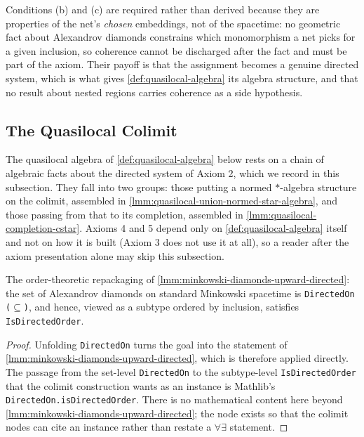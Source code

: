 \begin{definition}
    Conditions (b) and (c) are required rather than derived because they are properties of the net's \emph{chosen} embeddings, not of the spacetime: no geometric fact about Alexandrov diamonds constrains which monomorphism a net picks for a given inclusion, so coherence cannot be discharged after the fact and must be part of the axiom. Their payoff is that the assignment becomes a genuine directed system, which is what gives \ref{def:quasilocal-algebra} its algebra structure, and that no result about nested regions carries coherence as a side hypothesis.
\end{definition}

\subsection{The Quasilocal Colimit}

The quasilocal algebra of \ref{def:quasilocal-algebra} below rests on a chain of algebraic facts about the directed system of Axiom 2, which we record in this subsection. They fall into two groups: those putting a normed $*$-algebra structure on the colimit, assembled in \ref{lmm:quasilocal-union-normed-star-algebra}, and those passing from that to its completion, assembled in \ref{lmm:quasilocal-completion-cstar}. Axioms 4 and 5 depend only on \ref{def:quasilocal-algebra} itself and not on how it is built (Axiom 3 does not use it at all), so a reader after the axiom presentation alone may skip this subsection.

\begin{lemma}
    \label{lmm:alexandrov-diamonds-isDirected}
    \leanok
    The order-theoretic repackaging of \ref{lmm:minkowski-diamonds-upward-directed}: the set of Alexandrov diamonds on standard Minkowski spacetime is \texttt{DirectedOn (\ensuremath{\subseteq})}, and hence, viewed as a subtype ordered by inclusion, satisfies \texttt{IsDirectedOrder}.
\end{lemma}
\begin{proof}
    \leanok
    Unfolding \texttt{DirectedOn} turns the goal into the statement of \ref{lmm:minkowski-diamonds-upward-directed}, which is therefore applied directly. The passage from the set-level \texttt{DirectedOn} to the subtype-level \texttt{IsDirectedOrder} that the colimit construction wants as an instance is Mathlib's \texttt{DirectedOn.isDirectedOrder}. There is no mathematical content here beyond \ref{lmm:minkowski-diamonds-upward-directed}; the node exists so that the colimit nodes can cite an instance rather than restate a $\forall\exists$ statement.
\end{proof}

